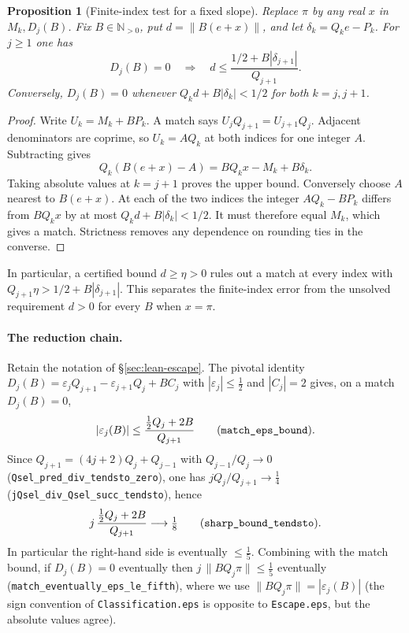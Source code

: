 \documentclass[11pt]{amsart}
\newtheorem{proposition}[theorem]{Proposition}
\theoremstyle{definition}
\theoremstyle{remark}
\numberwithin{equation}{section}
\newcommand{\N}{\mathbb{N}}
\begin{document}
\begin{proposition}[Finite-index test for a fixed slope]
\label{prop:finite-match}
Replace $\pi$ by any real $x$ in $M_k,D_j(B)$. Fix $B\in\N_{>0}$,
put $d=\|B(e+x)\|$, and let $\delta_k=Q_ke-P_k$. For $j\ge1$ one has
\[
 D_j(B)=0\quad\Longrightarrow\quad
 d\le \frac{1/2+B|\delta_{j+1}|}{Q_{j+1}}.
\]
Conversely, $D_j(B)=0$ whenever
$Q_k d+B|\delta_k|<1/2$ for both $k=j,j+1$.
\end{proposition}
\begin{proof}
Write $U_k=M_k+BP_k$. A match says
$U_jQ_{j+1}=U_{j+1}Q_j$. Adjacent denominators are coprime, so
$U_k=AQ_k$ at both indices for one integer $A$. Subtracting gives
\[
 Q_k(B(e+x)-A)=BQ_kx-M_k+B\delta_k .
\]
Taking absolute values at $k=j+1$ proves the upper bound.
Conversely choose $A$ nearest to $B(e+x)$. At each of the two
indices the integer $AQ_k-BP_k$ differs from $BQ_kx$ by at most
$Q_kd+B|\delta_k|<1/2$. It must therefore equal $M_k$,
which gives a match. Strictness removes any dependence on rounding
ties in the converse.
\end{proof}
In particular, a certified bound $d\ge\eta>0$ rules out a match
at every index with $Q_{j+1}\eta>1/2+B|\delta_{j+1}|$.
This separates the finite-index error from the unsolved requirement
$d>0$ for every $B$ when $x=\pi$.

\paragraph{The reduction chain.} Retain the notation of \S\ref{sec:lean-escape}. The pivotal identity $D_j(B)=\varepsilon_jQ_{j+1}-\varepsilon_{j+1}Q_j+BC_j$ with $|\varepsilon_j|\le\tfrac12$ and $|C_j|=2$ gives, on a match $D_j(B)=0$,
\[
|\varepsilon_j(B)|\le\frac{\tfrac12Q_j+2B}{Q_{j+1}}
\qquad\text{(\texttt{match\_eps\_bound}).}
\]
Since $Q_{j+1}=(4j+2)Q_j+Q_{j-1}$ with $Q_{j-1}/Q_j\to0$ (\texttt{Qsel\_pred\_div\_tendsto\_zero}), one has $jQ_j/Q_{j+1}\to\tfrac14$ (\texttt{jQsel\_div\_Qsel\_succ\_tendsto}), hence
\[
j\,\frac{\tfrac12Q_j+2B}{Q_{j+1}}\longrightarrow\tfrac18
\qquad\text{(\texttt{sharp\_bound\_tendsto}).}
\]
In particular the right-hand side is eventually $\le\tfrac15$. Combining with the match bound, if $D_j(B)=0$ eventually then $j\,\|BQ_j\pi\|\le\tfrac15$ eventually (\texttt{match\_eventually\_eps\_le\_fifth}), where we use $\|BQ_j\pi\|=|\varepsilon_j(B)|$ (the sign convention of \texttt{Classification.eps} is opposite to \texttt{Escape.eps}, but the absolute values agree).
\end{document}
